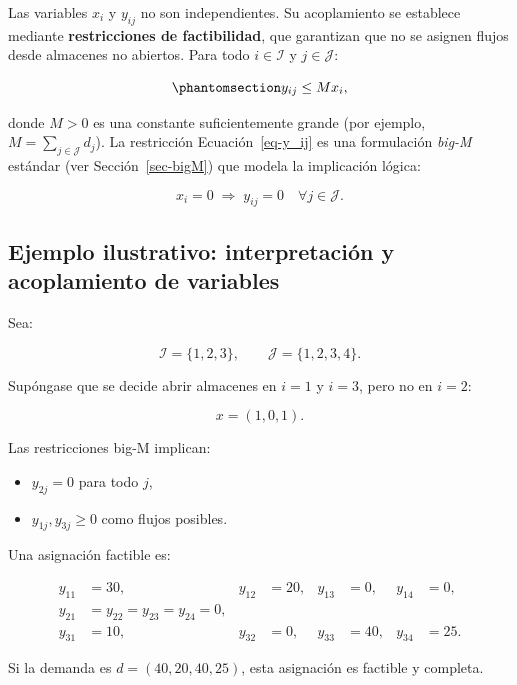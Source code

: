 \documentclass[
  spanish,
  us-letterpaper,
]{scrreprt}
\providecommand{\tightlist}{%
  \setlength{\itemsep}{0pt}\setlength{\parskip}{0pt}}
\numberwithin{equation}{section}
\begin{document}
Las variables \(x_i\) y \(y_{ij}\) no son independientes. Su
acoplamiento se establece mediante \textbf{restricciones de
factibilidad}, que garantizan que no se asignen flujos desde almacenes
no abiertos. Para todo \(i \in \mathcal{I}\) y \(j \in \mathcal{J}\):

\begin{equation}\phantomsection\label{eq-y_ij}{
y_{ij} \le M x_i,
}\end{equation}

donde \(M > 0\) es una constante suficientemente grande (por ejemplo,
\(M = \sum_{j \in \mathcal{J}} d_j\)). La restricción
Ecuación~\ref{eq-y_ij} es una formulación \emph{big-M} estándar (ver
Sección~\ref{sec-bigM}) que modela la implicación lógica:

\[
x_i = 0 \;\Rightarrow\; y_{ij} = 0 \quad \forall j \in \mathcal{J}.
\]

\subsection{\texorpdfstring{\textbf{Ejemplo ilustrativo: interpretación
y acoplamiento de
variables}}{Ejemplo ilustrativo: interpretación y acoplamiento de variables}}\label{sec-ejemplo-ilustrativo}

Sea:

\[
\mathcal{I} = \{1,2,3\}, \qquad \mathcal{J} = \{1,2,3,4\}.
\]

Supóngase que se decide abrir almacenes en \(i=1\) y \(i=3\), pero no en
\(i=2\):

\[
x = (1,0,1).
\]

Las restricciones big-M implican:

\begin{itemize}
\tightlist
\item
  \(y_{2j} = 0\) para todo \(j\),
\item
  \(y_{1j}, y_{3j} \ge 0\) como flujos posibles.
\end{itemize}

Una asignación factible es:

\[
\begin{aligned}
y_{11} &= 30, & y_{12} &= 20, & y_{13} &= 0, & y_{14} &= 0, \\
y_{21} &= y_{22} = y_{23} = y_{24} = 0, \\
y_{31} &= 10, & y_{32} &= 0, & y_{33} &= 40, & y_{34} &= 25.
\end{aligned}
\]

Si la demanda es \(d = (40,20,40,25)\), esta asignación es factible y
completa.
\end{document}
